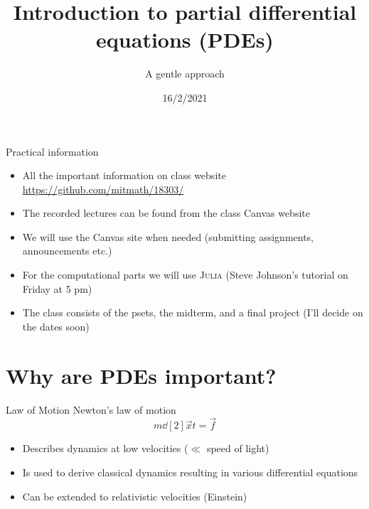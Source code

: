 

\title{Introduction to partial differential equations (PDEs)}
\subtitle{A gentle approach}
\date{16/2/2021}
\date{}


	
	\maketitle
	


\begin{frame}{Practical information}
	\begin{itemize}
		\item All the important information on class website \url{https://github.com/mitmath/18303/}
		\item The recorded lectures can be found from the class Canvas website
		\item We will use the Canvas site when needed (submitting assignments, announcements etc.)
		\item For the computational parts we will use \textsc{Julia} (Steve Johnson's tutorial on Friday at 5 pm)
		\item The class consists of the psets, the midterm, and a final project (I'll decide on the dates soon)
 	\end{itemize}
\end{frame}

\section{Why are PDEs important?}


\begin{frame}{Law of Motion}
		Newton's law of motion
		$$
		m \dd[2]{\vec{x}}{t} = \vec{f}
		$$
		\begin{itemize}
			\item Describes dynamics at low velocities ($ \ll $ speed of light)
			\item Is used to derive classical dynamics resulting in various differential equations
			\item Can be extended to relativistic velocities (Einstein)
		\end{itemize}
\end{frame}

